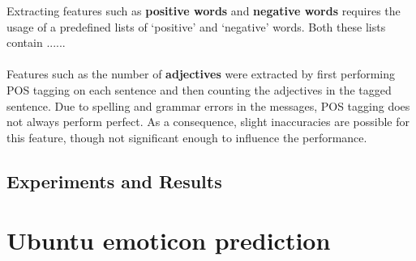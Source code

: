 \documentclass{article} %
\begin{document}
\noindent Extracting features such as \textbf{positive words} and \textbf{negative words} requires the usage of a predefined lists of `positive' and `negative' words. Both these lists contain ...... %
\\
\\
Features such as the number of \textbf{adjectives} were extracted by first performing POS tagging on each sentence and then counting the adjectives in the tagged sentence. Due to spelling and grammar errors in the messages, POS tagging does not always perform  perfect. As a consequence, slight inaccuracies are possible for this feature, though not significant enough to influence the performance.



\subsection{Experiments and Results}

\begin{comment}
Experiments / Empirical evaluation (roughly 2-3 pages)
• Any details about experiments (dataset sizes, parameter selection, etc)
• Results
• Analysis (discussion of results / visualization / findings / etc)
\end{comment}





\section{Ubuntu emoticon prediction}

\begin{comment}
Approach (roughly 2-3 pages)
• Explain the model; if any important assumptions are made at this stage, explain why they are
reasonable or necessary
• Explain learning / inference algorithms
• Explaining (perhaps briefly) any necessary preprocessing / postprocesing / data acquisition stages
(maybe earlier, depending on the project; may also move to the experimental section)
\end{comment}



\end{document}
